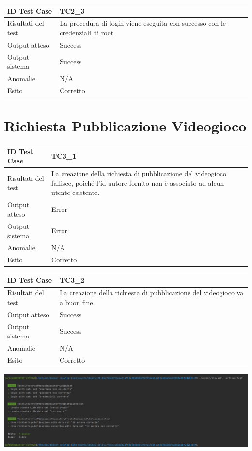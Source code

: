 \newpage
\begin{tabular}{|| l | p{25em} ||} 
\hline
ID Test Case & TC2\_3\\
\hline
Risultati del test & La procedura di login viene eseguita con successo con le credenziali di root\\
\hline
Output atteso & Success\\
\hline
Output sistema & Success\\
\hline
Anomalie & N/A\\
\hline
Esito & Corretto\\
\hline
\end{tabular}

\newpage
\section{Richiesta Pubblicazione Videogioco}
\begin{tabular}{|| l | p{25em} ||} 
\hline
ID Test Case & TC3\_1\\
\hline
Risultati del test & La creazione della richiesta di pubblicazione del videogioco fallisce, poiché l'id autore fornito non è associato ad alcun utente esistente.\\
\hline
Output atteso & Error\\
\hline
Output sistema & Error\\
\hline
Anomalie & N/A\\
\hline
Esito & Corretto\\
\hline
\end{tabular}

\newpage
\begin{tabular}{|| l | p{25em} ||} 
\hline
ID Test Case & TC3\_2\\
\hline
Risultati del test & La creazione della richiesta di pubblicazione del videogioco va a buon fine.\\
\hline
Output atteso & Success\\
\hline
Output sistema & Success\\
\hline
Anomalie & N/A\\
\hline
Esito & Corretto\\
\hline
\end{tabular}

\newpage
\begin{center}
\includegraphics[width=\textwidth,height=\textheight,keepaspectratio]{Figure/TestResults.png}
\end{center}